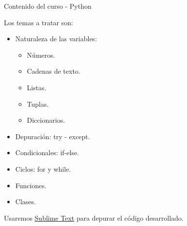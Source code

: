 \begin{frame}[t]{Contenido del curso - Python}\vspace{10pt}

Los temas a tratar son:

\begin{itemize}
	\item Naturaleza de las variables:
	\begin{itemize}
		\item Números.
		\item Cadenas de texto.
		\item Listas.
		\item Tuplas.
		\item Diccionarios.
	\end{itemize}
	\item Depuración: try - except.
	\item Condicionales: if-else.
	\item Ciclos: for y while.
	\item Funciones.
	\item Clases.
\end{itemize}

\vspace{10pt}

Usaremos {\color{blue} \href{https://www.sublimetext.com/}{Sublime Text}} para depurar el código desarrollado.

\end{frame}